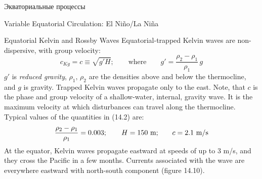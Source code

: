 \begin{chapter}{Экваториальные процессы}
\begin{section}{Variable Equatorial Circulation: El Ni\~{n}o/La Ni\~{n}a}
\begin{paragraph}{Equatorial Kelvin and Rossby Waves}
Equatorial-trapped Kelvin waves are
non-dispersive, with group velocity:
\begin{equation}
c_{Kg} = c \equiv \sqrt{g'H}; \qquad \text{where} \qquad
g' = \frac{\rho_2 - \rho_1}{\rho_1}\,g
\end{equation}
$g'$ is \textit{reduced gravity},
$\rho_1, \, \rho_2$ are the densities above and below the
thermocline, and $g$ is gravity. Trapped
Kelvin waves propagate only to the east. Note, that $c$ is the phase
and group velocity of a shallow-water, internal, gravity wave. It is
the maximum velocity at which disturbances can travel along the
thermocline. Typical values of the quantities in (14.2) are:
\begin{equation}
\frac{\rho_2 - \rho_1}{\rho_1} = 0.003; \qquad H=150 \text{ m;} \qquad c =2.1
\text{ m/s} \notag
\end{equation}
At the equator, Kelvin waves propagate eastward at
speeds of up to 3 m/s, and they cross the Pacific in a few
months. Currents associated with the wave are everywhere eastward with
north-south component (figure 14.10).
%


\end{paragraph}
\end{section}
\end{chapter}
